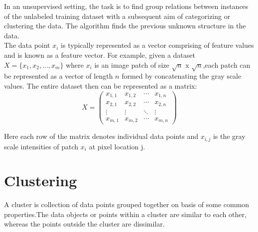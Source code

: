 In an unsupervised setting, the task is to find group relations between instances of the unlabeled training dataset with a subsequent aim of categorizing or clustering the data. The algorithm finds the previous unknown structure in the data.\\

The data point $x_i$ is typically represented as a vector comprising of feature values and is known as a feature vector. For example, given a dataset $X =\{x_1,x_2,...,x_m\}$ where $x_i$ is an image patch of size $\sqrt{n}$ x $\sqrt{n}$,each patch can be represented as a vector of length $n$ formed by concatenating the gray scale values. The entire dataset then can be represented as a matrix:
\begin{equation*}
X = \begin{pmatrix}
x_{1,1} & x_{1,2} & \cdots & x_{1,n} \\
x_{2,1} & x_{2,2} & \cdots & x_{2,n} \\
\vdots  & \vdots  & \ddots & \vdots  \\
x_{m,1} & x_{m,2} & \cdots & x_{m,n}
\end{pmatrix}
\end{equation*}

Here each row of the matrix denotes individual data points and ${x_{i,j}}$ is the gray scale intensities of patch $x_i$ at pixel location j.
%
%
%
%
%

\section{Clustering}
A cluster is collection of data points grouped together on basis of some common properties.The data objects or points within a cluster are similar to each other, whereas the points outside the cluster are dissimilar.\\

